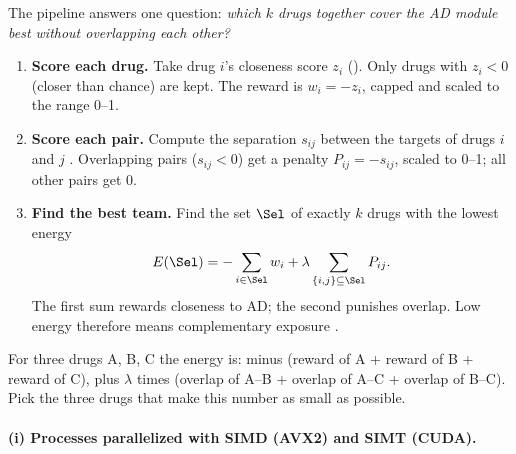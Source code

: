 The pipeline answers one question: \emph{which $k$ drugs together cover the AD module best without overlapping each other?}

\begin{enumerate}
\item \textbf{Score each drug.} Take drug $i$'s closeness score $z_i$ (). Only drugs with $z_i<0$ (closer than chance) are kept. The reward is $w_i=-z_i$, capped and scaled to the range 0--1.
\item \textbf{Score each pair.} Compute the separation $s_{ij}$ between the targets of drugs $i$ and $j$ \cite{menche2015uncovering}. Overlapping pairs ($s_{ij}<0$) get a penalty $P_{ij}=-s_{ij}$, scaled to 0--1; all other pairs get 0.
\item \textbf{Find the best team.} Find the set $\Sel$ of exactly $k$ drugs with the lowest energy
\begin{equation}
E(\Sel) = -\sum_{i\in\Sel} w_i + \lambda\sum_{\{i,j\}\subseteq\Sel} P_{ij}.
\label{eq:objective}
\end{equation}
The first sum rewards closeness to AD; the second punishes overlap. Low energy therefore means complementary exposure \cite{cheng2019combinations}.
\end{enumerate}


For three drugs A, B, C the energy is: minus (reward of A + reward of B + reward of C), plus $\lambda$ times (overlap of A--B + overlap of A--C + overlap of B--C). Pick the three drugs that make this number as small as possible.


\paragraph{(i) Processes parallelized with SIMD (AVX2) and SIMT (CUDA).}

